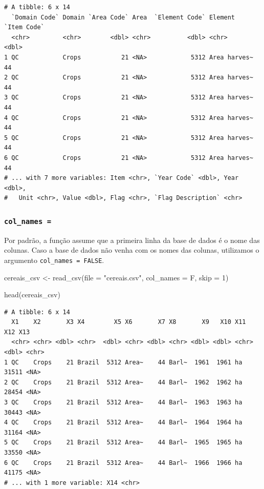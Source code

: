 \documentclass[
  brazilian,
]{book}
\newenvironment{Shaded}{\begin{snugshade}}{\end{snugshade}}
\newcommand{\AttributeTok}[1]{\textcolor[rgb]{0.77,0.63,0.00}{#1}}
\newcommand{\DecValTok}[1]{\textcolor[rgb]{0.00,0.00,0.81}{#1}}
\newcommand{\FunctionTok}[1]{\textcolor[rgb]{0.00,0.00,0.00}{#1}}
\newcommand{\NormalTok}[1]{#1}
\newcommand{\OtherTok}[1]{\textcolor[rgb]{0.56,0.35,0.01}{#1}}
\newcommand{\StringTok}[1]{\textcolor[rgb]{0.31,0.60,0.02}{#1}}
\begin{document}
\begin{verbatim}
# A tibble: 6 x 14
  `Domain Code` Domain `Area Code` Area  `Element Code` Element      `Item Code`
  <chr>         <chr>        <dbl> <chr>          <dbl> <chr>              <dbl>
1 QC            Crops           21 <NA>            5312 Area harves~          44
2 QC            Crops           21 <NA>            5312 Area harves~          44
3 QC            Crops           21 <NA>            5312 Area harves~          44
4 QC            Crops           21 <NA>            5312 Area harves~          44
5 QC            Crops           21 <NA>            5312 Area harves~          44
6 QC            Crops           21 <NA>            5312 Area harves~          44
# ... with 7 more variables: Item <chr>, `Year Code` <dbl>, Year <dbl>,
#   Unit <chr>, Value <dbl>, Flag <chr>, `Flag Description` <chr>
\end{verbatim}

\hypertarget{col_names}{%
\subsubsection*{\texorpdfstring{\texttt{col\_names\ =}}{col\_names =}}\label{col_names}}

Por padrão, a função assume que a primeira linha da base de dados é o nome das colunas. Caso a base de dados não venha com os nomes das colunas, utilizamos o argumento \texttt{col\_names\ =\ FALSE}.

\begin{Shaded}
\begin{Highlighting}[]
\NormalTok{cereais\_csv }\OtherTok{\textless{}{-}} \FunctionTok{read\_csv}\NormalTok{(}\AttributeTok{file =} \StringTok{"cereais.csv"}\NormalTok{,}
                        \AttributeTok{col\_names =}\NormalTok{ F,}
                        \AttributeTok{skip =} \DecValTok{1}\NormalTok{)}

\FunctionTok{head}\NormalTok{(cereais\_csv)}
\end{Highlighting}
\end{Shaded}

\begin{verbatim}
# A tibble: 6 x 14
  X1    X2       X3 X4        X5 X6       X7 X8       X9   X10 X11     X12 X13  
  <chr> <chr> <dbl> <chr>  <dbl> <chr> <dbl> <chr> <dbl> <dbl> <chr> <dbl> <chr>
1 QC    Crops    21 Brazil  5312 Area~    44 Barl~  1961  1961 ha    31511 <NA> 
2 QC    Crops    21 Brazil  5312 Area~    44 Barl~  1962  1962 ha    28454 <NA> 
3 QC    Crops    21 Brazil  5312 Area~    44 Barl~  1963  1963 ha    30443 <NA> 
4 QC    Crops    21 Brazil  5312 Area~    44 Barl~  1964  1964 ha    31164 <NA> 
5 QC    Crops    21 Brazil  5312 Area~    44 Barl~  1965  1965 ha    33550 <NA> 
6 QC    Crops    21 Brazil  5312 Area~    44 Barl~  1966  1966 ha    41175 <NA> 
# ... with 1 more variable: X14 <chr>
\end{verbatim}
\end{document}
